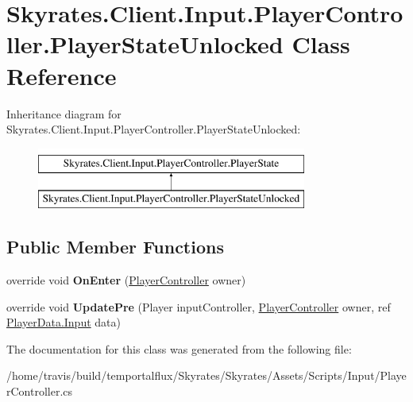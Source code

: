 \hypertarget{class_skyrates_1_1_client_1_1_input_1_1_player_controller_1_1_player_state_unlocked}{\section{Skyrates.\-Client.\-Input.\-Player\-Controller.\-Player\-State\-Unlocked Class Reference}
\label{class_skyrates_1_1_client_1_1_input_1_1_player_controller_1_1_player_state_unlocked}
}
Inheritance diagram for Skyrates.\-Client.\-Input.\-Player\-Controller.\-Player\-State\-Unlocked\-:\begin{figure}[H]
\begin{center}
\leavevmode
\includegraphics[height=2.000000cm]{class_skyrates_1_1_client_1_1_input_1_1_player_controller_1_1_player_state_unlocked}
\end{center}
\end{figure}
\subsection*{Public Member Functions}
\begin{DoxyCompactItemize}
\item 
\hypertarget{class_skyrates_1_1_client_1_1_input_1_1_player_controller_1_1_player_state_unlocked_a0ad8987c8fd1cd6aa066a4f061affabe}{override void {\bfseries On\-Enter} (\hyperlink{class_skyrates_1_1_client_1_1_input_1_1_player_controller}{Player\-Controller} owner)}\label{class_skyrates_1_1_client_1_1_input_1_1_player_controller_1_1_player_state_unlocked_a0ad8987c8fd1cd6aa066a4f061affabe}

\item 
\hypertarget{class_skyrates_1_1_client_1_1_input_1_1_player_controller_1_1_player_state_unlocked_adbf8591f765ae24eee41bb626937cccf}{override void {\bfseries Update\-Pre} (Player input\-Controller, \hyperlink{class_skyrates_1_1_client_1_1_input_1_1_player_controller}{Player\-Controller} owner, ref \hyperlink{struct_skyrates_1_1_data_1_1_player_data_1_1_input}{Player\-Data.\-Input} data)}\label{class_skyrates_1_1_client_1_1_input_1_1_player_controller_1_1_player_state_unlocked_adbf8591f765ae24eee41bb626937cccf}

\end{DoxyCompactItemize}


The documentation for this class was generated from the following file\-:\begin{DoxyCompactItemize}
\item 
/home/travis/build/temportalflux/\-Skyrates/\-Skyrates/\-Assets/\-Scripts/\-Input/Player\-Controller.\-cs\end{DoxyCompactItemize}
